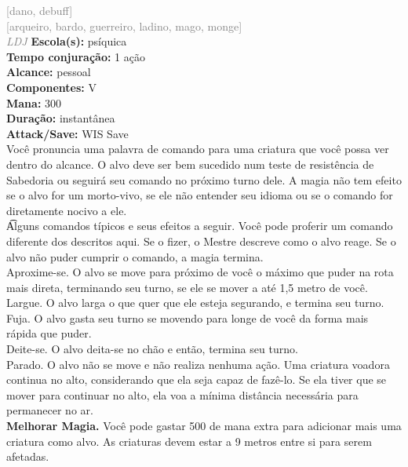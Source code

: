\documentclass{RPG_Adventure}[2021/10/20]
\begin{document}
{\scriptsize \textcolor{gray}{[dano, debuff]\\}}
{\scriptsize \textcolor{gray}{[arqueiro, bardo, guerreiro, ladino, mago, monge]\\}}
{\tiny \textcolor{gray}{\textit{LDJ}}}\jump{}
{\small \t \textbf{Escola(s):} psíquica\\\t \textbf{Tempo conjuração:} 1 ação\\\t \textbf{Alcance:} pessoal\\\t \textbf{Componentes:} V\\\t \textbf{Mana:} 300\\\t \textbf{Duração:} instantânea\\\t \textbf{Attack/Save:} WIS Save\\}
{\normalsize Você pronuncia uma palavra de comando para uma criatura que você possa ver dentro do alcance. O alvo deve ser bem sucedido num teste de resistência de Sabedoria ou seguirá seu comando no próximo turno dele. A magia não tem efeito se o alvo for um morto-vivo, se ele não entender seu idioma ou se o comando for diretamente nocivo a ele.\\\t Alguns comandos típicos e seus efeitos a seguir. Você pode proferir um comando diferente dos descritos aqui. Se o fizer, o Mestre descreve como o alvo reage. Se o alvo não puder cumprir o comando, a magia termina. \\\t \textit{}Aproxime-se.\textit{} O alvo se move para próximo de você o máximo que puder na rota mais direta, terminando seu turno, se ele se mover a até 1,5 metro de você.\\\t \textit{}Largue.\textit{} O alvo larga o que quer que ele esteja segurando, e termina seu turno.\\\t \textit{}Fuja.\textit{} O alvo gasta seu turno se movendo para longe de você da forma mais rápida que puder.\\\t \textit{}Deite-se.\textit{} O alvo deita-se no chão e então, termina seu turno.\\\t \textit{}Parado.\textit{} O alvo não se move e não realiza nenhuma ação. Uma criatura voadora continua no alto, considerando que ela seja capaz de fazê-lo. Se ela tiver que se mover para continuar no alto, ela voa a mínima distância necessária para permanecer no ar.\\\t \textbf{Melhorar Magia.} Você pode gastar 500 de mana extra para adicionar mais uma criatura como alvo. As criaturas devem estar a 9 metros entre si para serem afetadas.\\}
\end{document}
